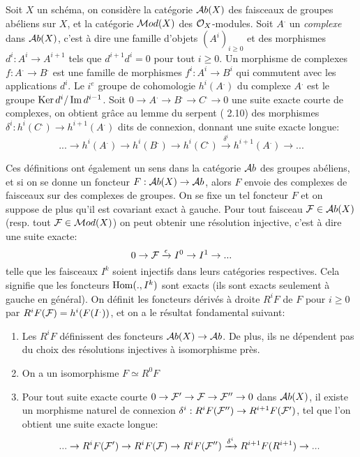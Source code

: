 Soit $X$ un schéma, on considère la catégorie $\mathcal{A} b(X)$ des faisceaux de groupes abéliens sur $X$, et la catégorie $\mathcal{M} od(X)$ des $\mathcal{O}_X$-modules. Soit $A^.$ un \textit{complexe} dans $\mathcal{A} b(X)$, c'est à dire une famille d'objets $(A^i)_{i\geq 0}$ et des morphismes $d^i:A^i\rightarrow A^{i+1}$ tels que $d^{i+1}d^i=0$ pour tout $i\geq 0$. Un morphisme de complexes $f:A^.\rightarrow B^.$ est une famille de morphismes $f^i:A^i\rightarrow B^i$ qui commutent avec les applications $d^i$. Le $i^e$ groupe de cohomologie $h^i(A^.)$ du complexe $A^.$ est le groupe $\operatorname{Ker} d^i/\operatorname{Im} d^{i-1}$. Soit $0\rightarrow A^.\rightarrow B^. \rightarrow C^. \rightarrow 0$ une suite exacte courte de complexes, on obtient grâce au lemme du serpent (\cite{atiyahmacdo} 2.10) des morphismes $\delta ^i:h^i(C^.)\rightarrow h^{i+1}(A^.) $ dits de connexion, donnant une suite exacte longue:
\begin{equation}\label{eq:longSES}
...\rightarrow h^i(A^.) \rightarrow h^i(B^.) \rightarrow h^i(C^.) \xrightarrow{\delta ^i} h^{i+1}(A^.) \rightarrow ...
\end{equation}

Ces définitions ont également un sens dans la catégorie $\mathcal{A} b$ des groupes abéliens, et si on se donne un foncteur $F:\mathcal{A} b(X)\rightarrow \mathcal{A} b$, alors $F$ envoie des complexes de faisceaux sur des complexes de groupes. On se fixe un tel foncteur $F$ et on suppose de plus qu'il est covariant exact à gauche. Pour tout faisceau $\mathcal{F}\in \mathcal{A} b(X)$ (resp. tout $\mathcal{F}\in\mathcal{M} od(X)$) on peut obtenir une résolution injective, c'est à dire une suite exacte:
$$0\rightarrow \mathcal{F} \xrightarrow{\epsilon} I^0\rightarrow I^1\rightarrow ...$$
telle que les faisceaux $I^k$ soient injectifs dans leurs catégories respectives. Cela signifie que les foncteurs $\operatorname{Hom}(.,I^k)$ sont exacts (ils sont exacts seulement à gauche en général). On définit les foncteurs dérivés à droite $R^iF$ de $F$ pour $i\geq 0$ par $R^i F(\mathcal{F})=h^i(F(I^.))$, et on a le résultat fondamental suivant:

\begin{thm}
\begin{enumerate}
\item Les $R^i F$ définissent des foncteurs $\mathcal{A} b(X)\rightarrow \mathcal{A} b$. De plus, ils ne dépendent pas du choix des résolutions injectives à isomorphisme près.
\item On a un isomorphisme $F\simeq R^0F$
\item Pour tout suite exacte courte $0\rightarrow \mathcal{F}'\rightarrow \mathcal{F} \rightarrow \mathcal{F}'' \rightarrow 0$ dans $\mathcal{A} b(X)$, il existe un morphisme naturel de connexion $\delta^i:R^iF(\mathcal{F}'')\rightarrow R^{i+1}F(\mathcal{F}')$, tel que l'on obtient une suite exacte longue:
$$...\rightarrow R^iF(\mathcal{F}') \rightarrow R^iF(\mathcal{F}) \rightarrow R^iF(\mathcal{F}'') \xrightarrow{\delta ^i} R^{i+1}F(R^{i+1}) \rightarrow ...$$
\end{enumerate}
\end{thm}

